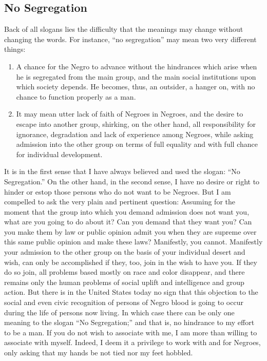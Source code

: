 \documentclass[letterpaper,10pt,english]{jupyterBook}
\begin{document}
\subsection{No Segregation}
\label{\detokenize{Volumes/41/04/segregation_in_the_north:no-segregation}}
\sphinxAtStartPar
Back of all slogans lies the difficulty that the meanings may change without changing the words. For instance, “no segregation” may mean two very different things:
\begin{enumerate}
%
\item {} 
\sphinxAtStartPar
A chance for the Negro to advance without the hindrances which arise when he is segregated from the main group, and the main social institutions upon which society depends. He becomes, thus, an outsider, a hanger on, with no chance to function properly as a man.

\item {} 
\sphinxAtStartPar
It may mean utter lack of faith of Negroes in Negroes, and the desire to escape into another group, shirking, on the other hand, all responsibility for ignorance, degradation and lack of experience among Negroes, while asking admission into the other group on terms of full equality and with full chance for individual development.

\end{enumerate}

\sphinxAtStartPar
It is in the first sense that I have always believed and used the slogan: “No Segregation.” On the other hand, in the second sense, I have no desire or right to hinder or estop those persons who do not want to be Negroes. But I am compelled to ask the very plain and pertinent question: Assuming for the moment that the group into which you demand admission does not want you, what are you going to do about it? Can you demand that they want you? Can you make them by law or public opinion admit you when they are supreme over this same public opinion and make these laws? Manifestly, you cannot. Manifestly your admission to the other group on the basis of your individual desert and wish, can only be accomplished if they, too, join in the wish to have you. If they do so join, all problems based mostly on race and color disappear, and there remains only the human problems of social uplift and intelligence and group action. But there is in the United States today no sign that this objection to the social and even civic recognition of persons of Negro blood is going to occur during the life of persons now living. In which case there can be only one meaning to the slogan “No Segregation;” and that is, no hindrance to my effort to be a man. If you do not wish to associate with me, I am more than willing to associate with myself. Indeed, I deem it a privilege to work with and for Negroes, only asking that my hands be not tied nor my feet hobbled.
\end{document}
